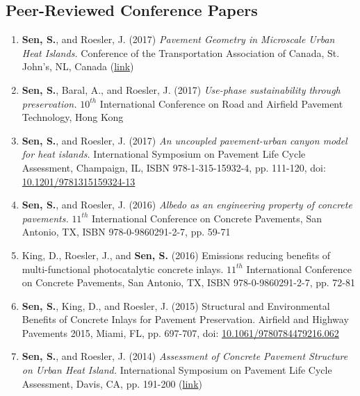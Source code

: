\documentclass[12pt]{article}
\begin{document}
\subsection*{Peer-Reviewed Conference Papers}
\begin{enumerate}[label=(C\arabic*)]
	\item \textbf{Sen, S.}, and Roesler, J. (2017) \textit{Pavement Geometry in Microscale Urban Heat Islands.} Conference of the Transportation Association of Canada, St. John’s, NL, Canada (\href{http://www.tac-atc.ca/sites/default/files/conf_papers/sens_-_pavement_geometry_in_microscale_urban_heat_islands.pdf}{link})
	\item \textbf{Sen, S.}, Baral, A., and Roesler, J. (2017) \textit{Use-phase sustainability through preservation.} $10^{th}$ International Conference on Road and Airfield Pavement Technology, Hong Kong
	\item \textbf{Sen, S.}, and Roesler, J. (2017) \textit{An uncoupled pavement-urban canyon model for heat islands.} International Symposium on Pavement Life Cycle Assessment, Champaign, IL, ISBN 978-1-315-15932-4, pp. 111-120, doi: \href{http://dx.doi.org/10.1201/9781315159324-13}{10.1201/9781315159324-13}
	\item \textbf{Sen, S.}, and Roesler, J. (2016) \textit{Albedo as an engineering property of concrete pavements.} $11^{th}$ International Conference on Concrete Pavements, San Antonio, TX, ISBN 978-0-9860291-2-7, pp. 59-71
	\item King, D., Roesler, J., and \textbf{Sen, S.} (2016) Emissions reducing benefits of multi-functional photocatalytic concrete inlays. $11^{th}$ International Conference on Concrete Pavements, San Antonio, TX, ISBN 978-0-9860291-2-7, pp. 72-81
	\item \textbf{Sen, S.}, King, D., and Roesler, J. (2015) Structural and Environmental Benefits of Concrete Inlays for Pavement Preservation. Airfield and Highway Pavements 2015, Miami, FL, pp. 697-707, doi: \href{http://dx/doi.org/10.1061/9780784479216.062}{10.1061/9780784479216.062}
	\item \textbf{Sen, S.}, and Roesler, J. (2014) \textit{Assessment of Concrete Pavement Structure on Urban Heat Island.} International Symposium on Pavement Life Cycle Assessment, Davis, CA, pp. 191-200 (\href{http://www.ucprc.ucdavis.edu/p-LCA2014/media/pdf/Papers/LCA14_Urban\%20Heat\%20Island.pdf}{link})
\end{enumerate}
\end{document}
